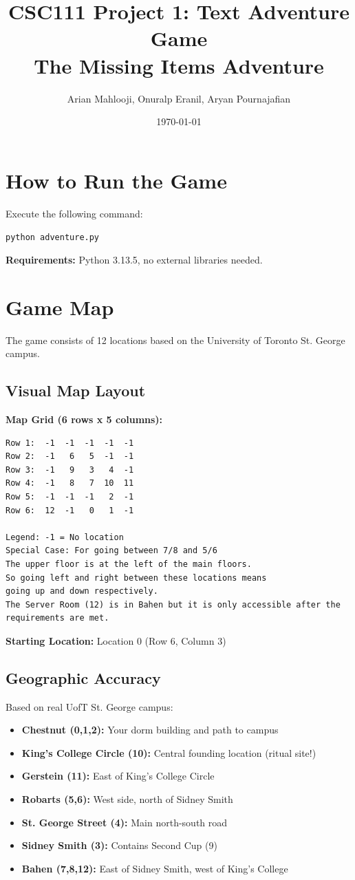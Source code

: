 \documentclass[12pt]{article}
\title{CSC111 Project 1: Text Adventure Game\\
\large The Missing Items Adventure}
\author{Arian Mahlooji, Onuralp Eranil, Aryan Pournajafian}
\date{\today}
\begin{document}
\maketitle
\tableofcontents
\newpage

\section{How to Run the Game}

Execute the following command:

\texttt{python adventure.py}

\textbf{Requirements:} Python 3.13.5, no external libraries needed.

\section{Game Map}

The game consists of 12 locations based on the University of Toronto St. George campus.

\subsection{Visual Map Layout}

\textbf{Map Grid (6 rows x 5 columns):}

\begin{verbatim}
Row 1:  -1  -1  -1  -1  -1
Row 2:  -1   6   5  -1  -1
Row 3:  -1   9   3   4  -1
Row 4:  -1   8   7  10  11
Row 5:  -1  -1  -1   2  -1
Row 6:  12  -1   0   1  -1

Legend: -1 = No location
Special Case: For going between 7/8 and 5/6
The upper floor is at the left of the main floors.
So going left and right between these locations means
going up and down respectively.
The Server Room (12) is in Bahen but it is only accessible after the requirements are met.
\end{verbatim}

\textbf{Starting Location:} Location 0 (Row 6, Column 3)

\subsection{Geographic Accuracy}

Based on real UofT St. George campus:

\begin{itemize}
\item \textbf{Chestnut (0,1,2):} Your dorm building and path to campus
\item \textbf{King's College Circle (10):} Central founding location (ritual site!)
\item \textbf{Gerstein (11):} East of King's College Circle
\item \textbf{Robarts (5,6):} West side, north of Sidney Smith
\item \textbf{St. George Street (4):} Main north-south road
\item \textbf{Sidney Smith (3):} Contains Second Cup (9)
\item \textbf{Bahen (7,8,12):} East of Sidney Smith, west of King's College
\end{itemize}
\end{document}

